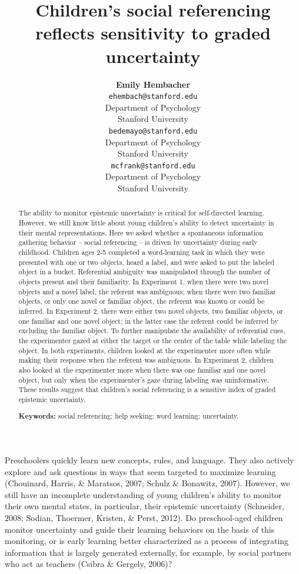 \documentclass[10pt, letterpaper]{article}
\title{Children's social referencing reflects sensitivity to graded uncertainty}
\author{{\large \bf Emily  Hembacher} \\ \texttt{ehembach@stanford.edu} \\ Department of Psychology \\ Stanford University \And {\large \bf Benjamin deMayo} \\ \texttt{bedemayo@stanford.edu} \\ Department of Psychology \\ Stanford University \And {\large \bf Michael C. Frank} \\ \texttt{mcfrank@stanford.edu} \\ Department of Psychology \\ Stanford University}
\begin{document}
\maketitle

\begin{abstract}
The ability to monitor epistemic uncertainty is critical for
self-directed learning. However, we still know little about young
children's ability to detect uncertainty in their mental
representations. Here we asked whether a spontaneous information
gathering behavior -- social referencing -- is driven by uncertainty
during early childhood. Children ages 2-5 completed a word-learning task
in which they were presented with one or two objects, heard a label, and
were asked to put the labeled object in a bucket. Referential ambiguity
was manipulated through the number of objects present and their
familiarity. In Experiment 1, when there were two novel objects and a
novel label, the referent was ambiguous; when there were two familiar
objects, or only one novel or familiar object, the referent was known or
could be inferred. In Experiment 2, there were either two novel objects,
two familiar objects, or one familiar and one novel object; in the
latter case the referent could be inferred by excluding the familiar
object. To further manipulate the availability of referential cues, the
experimenter gazed at either the target or the center of the table while
labeling the object. In both experiments, children looked at the
experimenter more often while making their response when the referent
was ambiguous. In Experiment 2, children also looked at the experimenter
more when there was one familiar and one novel object, but only when the
experimenter's gaze during labeling was uninformative. These results
suggest that children's social referencing is a sensitive index of
graded epistemic uncertainty.

\textbf{Keywords:}
social referencing; help seeking; word learning; uncertainty.
\end{abstract}

Preschoolers quickly learn new concepts, rules, and language. They also
actively explore and ask questions in ways that seem targeted to
maximize learning (Chouinard, Harris, \& Maratsos, 2007; Schulz \&
Bonawitz, 2007). However, we still have an incomplete understanding of
young children's ability to monitor their own mental states, in
particular, their epistemic uncertainty (Schneider, 2008; Sodian,
Thoermer, Kristen, \& Perst, 2012). Do preschool-aged children monitor
uncertainty and guide their learning behaviors on the basis of this
monitoring, or is early learning better characterized as a process of
integrating information that is largely generated externally, for
example, by social partners who act as teachers (Csibra \& Gergely,
2006)?
\end{document}

